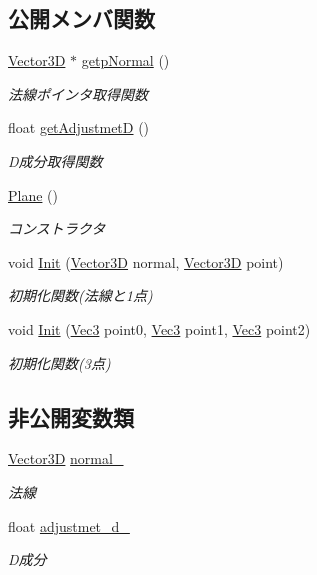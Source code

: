 \subsection*{公開メンバ関数}
\begin{DoxyCompactItemize}
\item 
\mbox{\hyperlink{class_vector3_d}{Vector3D}} $\ast$ \mbox{\hyperlink{class_plane_a8c279383bdaeb247e68c557960eb0c0c}{getp\+Normal}} ()
\begin{DoxyCompactList}\small\item\em 法線ポインタ取得関数 \end{DoxyCompactList}\item 
float \mbox{\hyperlink{class_plane_a66c47e8798df166c458ca215ed115684}{get\+AdjustmetD}} ()
\begin{DoxyCompactList}\small\item\em D成分取得関数 \end{DoxyCompactList}\item 
\mbox{\hyperlink{class_plane_acac0d9c003e0ab10d07b146c3566a0c7}{Plane}} ()
\begin{DoxyCompactList}\small\item\em コンストラクタ \end{DoxyCompactList}\item 
void \mbox{\hyperlink{class_plane_a2182719af8f880a3871be4cfc33a969b}{Init}} (\mbox{\hyperlink{class_vector3_d}{Vector3D}} normal, \mbox{\hyperlink{class_vector3_d}{Vector3D}} point)
\begin{DoxyCompactList}\small\item\em 初期化関数(法線と1点) \end{DoxyCompactList}\item 
void \mbox{\hyperlink{class_plane_ae50b8a5b6e6e7db1b0bdd5c6df515848}{Init}} (\mbox{\hyperlink{_vector3_d_8h_ab16f59e4393f29a01ec8b9bbbabbe65d}{Vec3}} point0, \mbox{\hyperlink{_vector3_d_8h_ab16f59e4393f29a01ec8b9bbbabbe65d}{Vec3}} point1, \mbox{\hyperlink{_vector3_d_8h_ab16f59e4393f29a01ec8b9bbbabbe65d}{Vec3}} point2)
\begin{DoxyCompactList}\small\item\em 初期化関数(3点) \end{DoxyCompactList}\end{DoxyCompactItemize}
\subsection*{非公開変数類}
\begin{DoxyCompactItemize}
\item 
\mbox{\hyperlink{class_vector3_d}{Vector3D}} \mbox{\hyperlink{class_plane_a7ae74465500dfdd7a68fa2eb28486ae0}{normal\+\_\+}}
\begin{DoxyCompactList}\small\item\em 法線 \end{DoxyCompactList}\item 
float \mbox{\hyperlink{class_plane_ab43e3263bd879ea710936d85cacb6006}{adjustmet\+\_\+d\+\_\+}}
\begin{DoxyCompactList}\small\item\em D成分 \end{DoxyCompactList}\end{DoxyCompactItemize}
